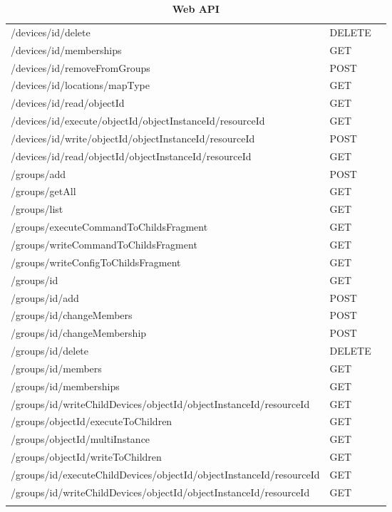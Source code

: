 \begin{longtable}{ p{11cm} p{4cm} l}
/devices/{id}/delete	&	DELETE	 \\ \addlinespace
/devices/{id}/memberships	&	GET	 \\ \addlinespace
/devices/{id}/removeFromGroups	&	POST	 \\ \addlinespace
/devices/{id}/locations/{mapType}	&	GET	 \\ \addlinespace
/devices/{id}/read/{objectId}	&	GET	 \\ \addlinespace
/devices/{id}/execute/{objectId}/{objectInstanceId}/{resourceId}	&	GET	 \\ \addlinespace
/devices/{id}/write/{objectId}/{objectInstanceId}/{resourceId}	&	POST	 \\ \addlinespace
/devices/{id}/read/{objectId}/{objectInstanceId}/{resourceId}	&	GET	 \\ \addlinespace
/groups/add	&	POST	 \\ \addlinespace
/groups/getAll	&	GET	 \\ \addlinespace
/groups/list	&	GET	 \\ \addlinespace
/groups/executeCommandToChildsFragment	&	GET	 \\ \addlinespace
/groups/writeCommandToChildsFragment	&	GET	 \\ \addlinespace
/groups/writeConfigToChildsFragment	&	GET	 \\ \addlinespace
/groups/{id}	&	GET	 \\ \addlinespace
/groups/{id}/add	&	POST	 \\ \addlinespace
/groups/{id}/changeMembers	&	POST	 \\ \addlinespace
/groups/{id}/changeMembership	&	POST	 \\ \addlinespace
/groups/{id}/delete	&	DELETE	 \\ \addlinespace
/groups/{id}/members	&	GET	 \\ \addlinespace
/groups/{id}/memberships	&	GET	 \\ \addlinespace
/groups/{id}/writeChildDevices/{objectId}/{objectInstanceId}/{resourceId}	&	GET	 \\ \addlinespace
/groups/{objectId}/executeToChildren	&	GET	 \\ \addlinespace
/groups/{objectId}/multiInstance	&	GET	 \\ \addlinespace
/groups/{objectId}/writeToChildren	&	GET	 \\ \addlinespace
/groups/{id}/executeChildDevices/{objectId}/{objectInstanceId}/{resourceId}	&	GET	 \\ \addlinespace
/groups/{id}/writeChildDevices/{objectId}/{objectInstanceId}/{resourceId}	&	GET	 \\ \addlinespace

\hline\caption{\textbf{Web API}}
\end{longtable}




